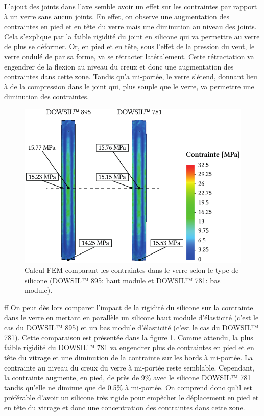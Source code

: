 \documentclass[11pt,titlepage]{article}
\begin{document}
L'ajout des joints dans l'axe semble avoir un effet sur les contraintes par rapport à un verre sans aucun joints. En effet, on observe une augmentation des contraintes en pied et en tête du verre mais une diminution au niveau des joints. Cela s'explique par la faible rigidité du joint en silicone qui va permettre au verre de plus se déformer. Or, en pied et en tête, sous l'effet de la pression du vent, le verre ondulé de par sa forme, va se rétracter latéralement. Cette rétractation va engendrer de la flexion au niveau du creux et donc une augmentation des contraintes dans cette zone. Tandis qu'a mi-portée, le verre s'étend, donnant lieu à de la compression dans le joint qui, plus souple que le verre, va permettre une diminution des contraintes. 
\newpage
\begin{figure}
\centering
\includegraphics[width=\linewidth]{img/ondul/fem/femjoint3.pdf}
\caption{Calcul \acrshort{FEM} comparant les contraintes dans le verre selon le type de silicone (DOWSIL™ 895: haut module et DOWSIL™ 781: bas module).}
\label{fig:femjoints3}
\vspace{-10pt}
\end{figure}
ff
On peut dès lors comparer l'impact de la rigidité du silicone sur la contrainte dans le verre en mettant en parallèle un silicone haut module d'élasticité (c'est le cas du DOWSIL™ 895) et un bas module d'élasticité (c'est le cas du DOWSIL™ 781). Cette comparaison est présentée dans la figure \ref{fig:femjoints3}. 
Comme attendu, la plus faible rigidité du DOWSIL™ 781 va engendrer plus de contraintes en pied et en tête du vitrage et une diminution de la contrainte sur les bords à mi-portée. La contrainte au niveau du creux du verre à mi-portée reste semblable. Cependant, la contrainte augmente, en pied, de près de 9\% avec le silicone DOWSIL™ 781 tandis qu'elle ne diminue que de 0.5\% à mi-portée. On comprend donc qu'il est préférable d'avoir un silicone très rigide pour empêcher le déplacement en pied et en tête du vitrage et donc une concentration des contraintes dans cette zone.
\end{document}
